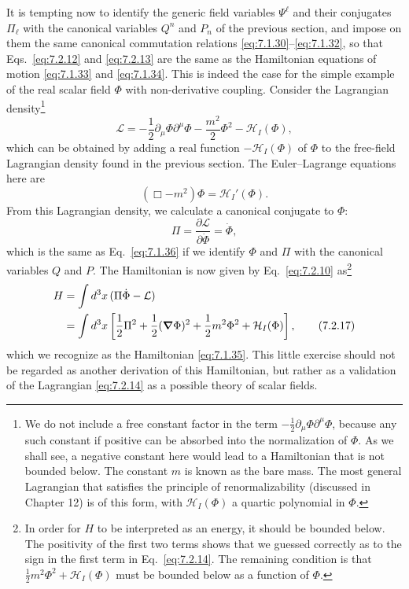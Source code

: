 It is tempting now to identify the generic field variables $\Psi^\ell$ and their
conjugates $\Pi_\ell$ with the canonical variables $Q^n$ and $P_n$ of the previous
section, and impose on them the same canonical commutation relations
\eqref{eq:7.1.30}--\eqref{eq:7.1.32}, so that Eqs.~\eqref{eq:7.2.12} and \eqref{eq:7.2.13} are the same as the
Hamiltonian equations of motion \eqref{eq:7.1.33} and \eqref{eq:7.1.34}. This is indeed the
case for the simple example of the real scalar field $\Phi$ with non-derivative
coupling. Consider the Lagrangian density\footnote{We do not include a free
constant factor in the term $-\tfrac12\partial_\mu\Phi\partial^\mu\Phi$, because
any such constant if positive can be absorbed into the normalization of $\Phi$.
As we shall see, a negative constant here would lead to a Hamiltonian that is
not bounded below. The constant $m$ is known as the bare mass. The most
general Lagrangian that satisfies the principle of renormalizability (discussed
in Chapter 12) is of this form, with $\mathcal{H}_I(\Phi)$ a quartic polynomial
in $\Phi$.}
\begin{equation}
\mathcal{L}=-\frac12\partial_\mu\Phi\partial^\mu\Phi
-\frac{m^2}{2}\Phi^2-\mathcal{H}_I(\Phi),
\tag{7.2.14}\label{eq:7.2.14}
\end{equation}
which can be obtained by adding a real function $-\mathcal{H}_I(\Phi)$ of $\Phi$
to the free-field Lagrangian density found in the previous section. The
Euler--Lagrange equations here are
\begin{equation}
(\Box-m^2)\Phi=\mathcal{H}_I'(\Phi).
\tag{7.2.15}\label{eq:7.2.15}
\end{equation}
From this Lagrangian density, we calculate a canonical conjugate to $\Phi$:
\begin{equation}
\Pi=\frac{\partial\mathcal{L}}{\partial\dot\Phi}=\dot\Phi,
\tag{7.2.16}\label{eq:7.2.16}
\end{equation}
which is the same as Eq.~\eqref{eq:7.1.36} if we identify $\Phi$ and $\Pi$ with the canonical
variables $Q$ and $P$. The Hamiltonian is now given by Eq.~\eqref{eq:7.2.10} as\footnote{In
order for $H$ to be interpreted as an energy, it should be bounded below. The
positivity of the first two terms shows that we guessed correctly as to the sign
in the first term in Eq.~\eqref{eq:7.2.14}. The remaining condition is that
$\tfrac12m^2\Phi^2+\mathcal{H}_I(\Phi)$ must be bounded below as a function of
$\Phi$.}
\begin{align}
H&=\int d^3x\,(\Pi\dot\Phi-\mathcal{L})
\notag\\
&=\int d^3x\left[\frac12\Pi^2+\frac12(\boldsymbol{\nabla}\Phi)^2
+\frac12m^2\Phi^2+\mathcal{H}_I(\Phi)\right],
\tag{7.2.17}\label{eq:7.2.17}
\end{align}
which we recognize as the Hamiltonian \eqref{eq:7.1.35}. This little exercise should
not be regarded as another derivation of this Hamiltonian, but rather as a
validation of the Lagrangian \eqref{eq:7.2.14} as a possible theory of scalar fields.

